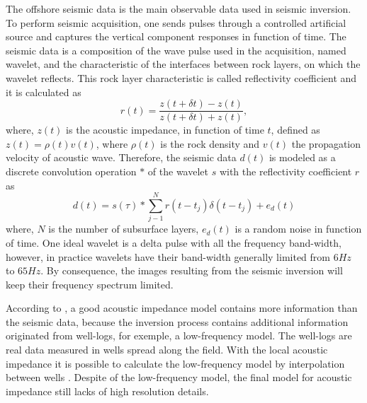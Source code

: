 \documentclass[conference,compsoc]{IEEEtran}
\begin{document}
The offshore seismic data is the main observable data used in seismic inversion. To perform seismic acquisition,
one sends pulses through a controlled artificial source and captures
the vertical component responses in function of time. The seismic data is a composition of
the wave pulse used in the acquisition, named wavelet, and the characteristic of the interfaces between rock layers,
on which the wavelet reflects. This rock layer characteristic is called reflectivity coefficient and it is
calculated as
\begin{equation}
r(t) = \frac{z(t+\delta t)-z(t)}{z(t+\delta t)+z(t)},
\label{eq:refletv}
\end{equation}
where, $z(t)$ is the acoustic impedance, in function of time $t$, defined as 
$z(t)=\rho(t)v(t)$, where $\rho(t)$ is the rock density and $v(t)$ the propagation velocity
of acoustic wave.
Therefore, the seismic data  $d(t)$ is modeled as a discrete convolution operation $*$ of the wavelet $s$ with the
reflectivity coefficient $r$ as
\begin{equation}
d(t) = s(\tau) * \sum_{j-1}^{N}{r(t- t_j) \delta(t - t_j) + e_d(t)}
\end{equation}
where, $N$ is the number of subsurface layers, $e_d(t)$ is a random noise in function of time.
One ideal wavelet is a delta pulse with all the frequency band-width, however, in practice
wavelets have their band-width generally limited from $6Hz$ to $65Hz$. By consequence,
the images resulting from the seismic inversion will keep their frequency spectrum limited.

According to \cite{Latimer}, a good acoustic impedance model contains more information
than the seismic data, because the inversion process contains additional information originated from well-logs, for
exemple, a low-frequency model.
The well-logs are real data measured in wells spread along the field.
With the local acoustic impedance it is possible to calculate the low-frequency
model by interpolation between wells \cite{Buland2003,Figueiredo2012}. Despite of the
low-frequency model, the final model for acoustic impedance still lacks of high resolution details.
\end{document}
